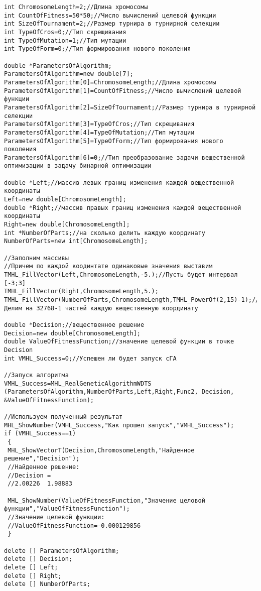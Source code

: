 \documentclass[a4paper,12pt]{article}
\begin{document}
\begin{lstlisting}[label=code_use_MHL_RealGeneticAlgorithmWDTS,caption=Пример использования]
int ChromosomeLength=2;//Длина хромосомы
int CountOfFitness=50*50;//Число вычислений целевой функции
int SizeOfTournament=2;//Размер турнира в турнирной селекции
int TypeOfCros=0;//Тип скрещивания
int TypeOfMutation=1;//Тип мутации
int TypeOfForm=0;//Тип формирования нового поколения

double *ParametersOfAlgorithm;
ParametersOfAlgorithm=new double[7];
ParametersOfAlgorithm[0]=ChromosomeLength;//Длина хромосомы
ParametersOfAlgorithm[1]=CountOfFitness;//Число вычислений целевой функции
ParametersOfAlgorithm[2]=SizeOfTournament;//Размер турнира в турнирной селекции
ParametersOfAlgorithm[3]=TypeOfCros;//Тип скрещивания
ParametersOfAlgorithm[4]=TypeOfMutation;//Тип мутации
ParametersOfAlgorithm[5]=TypeOfForm;//Тип формирования нового поколения
ParametersOfAlgorithm[6]=0;//Тип преобразование задачи вещественной оптимизации в задачу бинарной оптимизации

double *Left;//массив левых границ изменения каждой вещественной координаты
Left=new double[ChromosomeLength];
double *Right;//массив правых границ изменения каждой вещественной координаты
Right=new double[ChromosomeLength];
int *NumberOfParts;//на сколько делить каждую координату
NumberOfParts=new int[ChromosomeLength];

//Заполним массивы
//Причем по каждой коодинтате одинаковые значения выставим
TMHL_FillVector(Left,ChromosomeLength,-5.);//Пусть будет интервал [-3;3]
TMHL_FillVector(Right,ChromosomeLength,5.);
TMHL_FillVector(NumberOfParts,ChromosomeLength,TMHL_PowerOf(2,15)-1);//Делим на 32768-1 частей каждую вещественную координату

double *Decision;//вещественное решение
Decision=new double[ChromosomeLength];
double ValueOfFitnessFunction;//значение целевой функции в точке Decision
int VMHL_Success=0;//Успешен ли будет запуск cГА

//Запуск алгоритма
VMHL_Success=MHL_RealGeneticAlgorithmWDTS (ParametersOfAlgorithm,NumberOfParts,Left,Right,Func2, Decision, &ValueOfFitnessFunction);

//Используем полученный результат
MHL_ShowNumber(VMHL_Success,"Как прошел запуск","VMHL_Success");
if (VMHL_Success==1)
 {
 MHL_ShowVectorT(Decision,ChromosomeLength,"Найденное решение","Decision");
 //Найденное решение:
 //Decision =	
 //2.00226	1.98883

 MHL_ShowNumber(ValueOfFitnessFunction,"Значение целовой функции","ValueOfFitnessFunction");
 //Значение целевой функции:
 //ValueOfFitnessFunction=-0.000129856
 }

delete [] ParametersOfAlgorithm;
delete [] Decision;
delete [] Left;
delete [] Right;
delete [] NumberOfParts;
\end{lstlisting}
\end{document}

